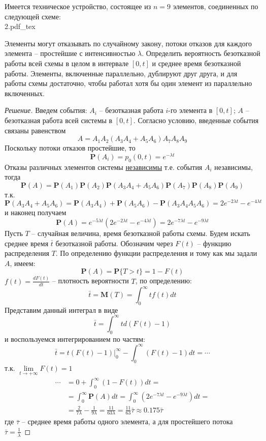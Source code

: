 \documentclass[12pt,a4paper]{article}
\newcommand{\incfig}[1]{%
	\def\svgwidth{\columnwidth}
	{#1.pdf_tex}
}
\newcommand{\pP}{\mathbf{P}}
\begin{document}
\begin{exercise}[Задача 4]
	Имеется техническое устройство, состоящее из $n=9$ элементов, соединенных по следующей схеме: \\
	
	\incfig{2}
	
	Элементы могут отказывать по случайному закону, потоки отказов для каждого элемента -- простейшие с интенсивностью $\lambda$. Определить вероятность безотказной работы всей схемы в целом в интервале $[0, t]$ и среднее время безотказной работы. Элементы, включенные параллельно, дублируют друг друга, и для работы схемы достаточно, чтобы работал хотя бы один элемент из параллельно включенных.
\end{exercise}
\begin{proof}[Решение]
	Введем события: $A_i$ -- безотказная работа $i$-го элемента в $[0, t]$; $A$ -- безотказная работа всей системы в $[0, t]$. Согласно условию, введенные события связаны равенством
	$$A = A_1 A_2 (A_3 A_4 + A_5 A_6) A_7 A_8 A_9$$
	Поскольку потоки отказов простейшие, то
	$$\pP(A_i) = p_0 (0, t) = e^{-\lambda t}$$
	Отказы различных элементов системы \underline{независимы} т.е. события $A_i$ независимы, тогда
	$$\pP(A) = \pP(A_1) \pP(A_2) \pP(A_3 A_4 + A_5 A_6) \pP(A_7) \pP(A_8) \pP(A_9)$$
	т.к. 
	$$\pP(A_3 A_4 + A_5 A_6) = \pP(A_3 A_4) + \pP(A_5 A_6) - \pP(A_3 A_4 A_5 A_6) = 2e^{-2\lambda t} - e^{-4\lambda t}$$
	и наконец получаем
	$$\pP(A) = e^{-5\lambda t}\left(2e^{-2\lambda t} - e^{-4\lambda t}\right) = 2e^{-7\lambda t} - e^{-9\lambda t}$$
	Пусть $T$ -- случайная величина, время безотказной работы схемы. Будем искать среднее время $\bar{t}$ безотказной работы. Обозначим через $F(t)$ -- функцию распределения $T$. По определению функции распределения и тому как мы задали $A$, имеем:
	$$\pP(A) = \pP\{T > t\} = 1 - F(t)$$
	$f(t) = \frac{dF (t)}{dt}$ -- плотность вероятности $T$, по определению:
	$$\bar{t} = \mathbf{M}(T) = \int_{0}^{\infty}{t f(t) dt}$$
	Представим данный интеграл в виде
	$$\bar{t} = \int_{0}^{\infty}{t d(F(t) - 1)}$$
	и воспользуемся интегрированием по частям:
	\begin{equation*}
		\bar{t} = t(F(t) - 1) \rvert_{0}^{\infty} - \int_{0}^{\infty}{(F(t) - 1)dt} = \cdots
	\end{equation*}
	т.к. $\lim\limits_{t \to +\infty}{F(t)} = 1$
	\begin{align*}
		\cdots &= 0 + \int_{0}^{\infty}{(1 - F(t))dt} = \\
				&= \int_{0}^{\infty}{\pP(A)dt} = \int_{0}^{\infty}{\left(2e^{-7\lambda t} - e^{-9\lambda t}\right) dt} = \\
				&= \frac{2}{7 \lambda} - \frac{1}{9 \lambda} = \frac{11}{63 \lambda} = \frac{11}{63}\bar{\tau} \approx 0.175\bar{\tau}
	\end{align*}
	где $\bar{\tau}$ -- среднее время работы одного элемента, а для простейшего потока \\ $\bar{\tau} = \frac{1}{\lambda}$
\end{proof}
\end{document}

